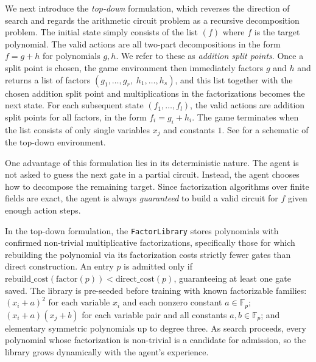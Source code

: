 \documentclass{article}
\theoremstyle{definition}
\theoremstyle{remark}
\begin{document}
We next introduce the \textit{top-down} formulation, which reverses the direction of search and regards the arithmetic circuit problem as a recursive decomposition problem. The initial state simply consists of the list $(f)$ where $f$ is the target polynomial. The valid actions are all two-part decompositions in the form $f = g +h$ for polynomials $g,h$. We refer to these as \textit{addition split points}. Once a split point is chosen, the game environment then immediately factors $g$ and $h$ and returns a list of factors $(g_1, \dots, g_r, \; h_1, \dots, h_s)$, and this list together with the chosen addition split point and multiplications in the factorizations becomes the next state. For each subsequent state $(f_1, \dots, f_l)$, the valid actions are addition split points for all factors, in the form $f_i = g_i + h_i$. The game terminates when the list consists of only single variables $x_j$ and constants $1$. See  for a schematic of the top-down environment. 

One advantage of this formulation lies in its deterministic nature. The agent is not asked to guess the next gate in a partial circuit. Instead, the agent chooses how to decompose the remaining target. Since factorization algorithms over finite fields are exact, the agent is always \textit{guaranteed} to build a valid circuit for $f$ given enough action steps. 

In the top-down formulation, the \texttt{FactorLibrary} stores polynomials with confirmed non-trivial multiplicative factorizations, specifically those for which rebuilding the polynomial via its factorization costs strictly fewer gates than direct construction. An entry $p$ is admitted only if $\mathrm{rebuild\_cost}(\mathrm{factor}(p)) < \mathrm{direct\_cost}(p)$, guaranteeing at least one gate saved. The library is pre-seeded before training with known factorizable families: $(x_i + a)^2$ for each variable $x_i$ and each nonzero constant $a \in \mathbb{F}_p$; $(x_i + a)(x_j + b)$ for each variable pair and all constants $a, b \in \mathbb{F}_p$; and elementary symmetric polynomials up to degree three. As search proceeds, every polynomial whose factorization is non-trivial is a candidate for admission, so the library grows dynamically with the agent's experience.
\end{document}
